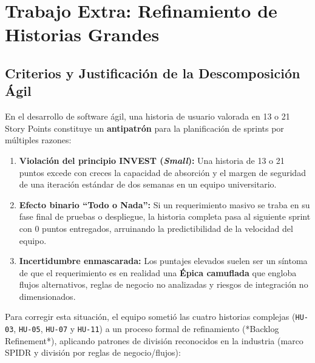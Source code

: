 \section{Trabajo Extra: Refinamiento de Historias Grandes}

\subsection{Criterios y Justificación de la Descomposición Ágil}

En el desarrollo de software ágil, una historia de usuario valorada en 13 o 21 Story Points constituye un \textbf{antipatrón} para la planificación de sprints por múltiples razones:
\begin{enumerate}
    \item \textbf{Violación del principio INVEST (\textit{Small}):} Una historia de 13 o 21 puntos excede con creces la capacidad de absorción y el margen de seguridad de una iteración estándar de dos semanas en un equipo universitario.
    \item \textbf{Efecto binario \enquote{Todo o Nada}:} Si un requerimiento masivo se traba en su fase final de pruebas o despliegue, la historia completa pasa al siguiente sprint con 0 puntos entregados, arruinando la predictibilidad de la velocidad del equipo.
    \item \textbf{Incertidumbre enmascarada:} Los puntajes elevados suelen ser un síntoma de que el requerimiento es en realidad una \textbf{Épica camuflada} que engloba flujos alternativos, reglas de negocio no analizadas y riesgos de integración no dimensionados.
\end{enumerate}

Para corregir esta situación, el equipo sometió las cuatro historias complejas (\texttt{HU-03}, \texttt{HU-05}, \texttt{HU-07} y \texttt{HU-11}) a un proceso formal de refinamiento (*Backlog Refinement*), aplicando patrones de división reconocidos en la industria (marco SPIDR y división por reglas de negocio/flujos):

